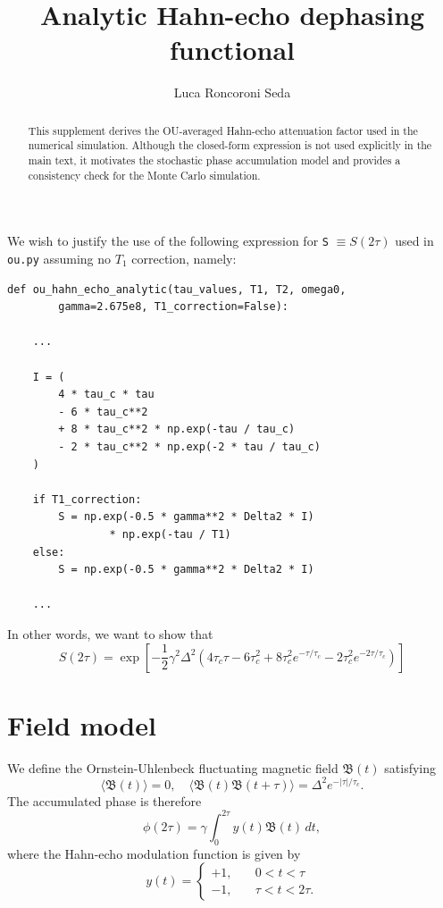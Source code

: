 \documentclass[12pt,reqno]{amsart}
\title{Analytic Hahn-echo dephasing functional}
\author{Luca Roncoroni Seda}
\theoremstyle{plain}
\begin{document}
\begin{abstract}
    This supplement derives the OU-averaged Hahn-echo attenuation factor used in the numerical simulation. Although the closed-form expression is not used explicitly in the main text, it motivates the stochastic phase accumulation model and provides a consistency check for the Monte Carlo simulation.
\end{abstract}

\maketitle

We wish to justify the use of the following expression for \verb*|S| $\equiv S(2\tau)$ used in \verb*|ou.py| assuming no $T_1$ correction, namely:
\begin{verbatim}
def ou_hahn_echo_analytic(tau_values, T1, T2, omega0, 
        gamma=2.675e8, T1_correction=False):
    
    ...

    I = (
        4 * tau_c * tau
        - 6 * tau_c**2
        + 8 * tau_c**2 * np.exp(-tau / tau_c)
        - 2 * tau_c**2 * np.exp(-2 * tau / tau_c)
    )

    if T1_correction:
        S = np.exp(-0.5 * gamma**2 * Delta2 * I) 
                * np.exp(-tau / T1)
    else:
        S = np.exp(-0.5 * gamma**2 * Delta2 * I)

    ...

\end{verbatim}
In other words, we want to show that
\begin{equation*}
    S(2\tau) = \exp{\left[ -\frac{1}{2}\gamma^2\Delta^2 \left(4\tau_c\tau - 6\tau_c^2 + 8\tau_c^2 e^{-\tau/\tau_c} - 2\tau_c^2 e^{-2\tau/\tau_c}\right) \right]}
\end{equation*}

\section{Field model}
We define the Ornstein-Uhlenbeck fluctuating magnetic field $\mathfrak{B} (t)$ satisfying
\begin{equation*}
    \langle \mathfrak{B}(t) \rangle = 0, \quad \langle \mathfrak{B}(t)\mathfrak{B}(t+\tau)\rangle =\Delta^2 e^{-\lvert\tau\rvert/\tau_c}.
\end{equation*}
The accumulated phase is therefore
\begin{equation*}
    \phi(2\tau) = \gamma\int_{0}^{2\tau} y(t) \mathfrak{B}(t)\,dt,
\end{equation*}
where the Hahn-echo modulation function is given by
\begin{equation*}
    y(t) =
    \begin{cases}
        +1,\quad & 0<t<\tau\\
        -1,\quad & \tau<t<2\tau.
    \end{cases}
\end{equation*}
\end{document}
